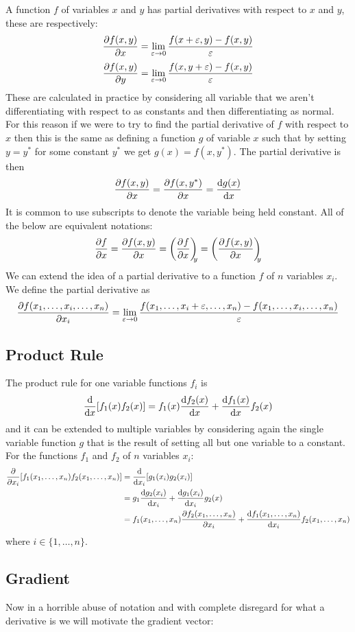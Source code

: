 \documentclass{article}
\begin{document}
    A function \(f\) of variables \(x\) and \(y\) has partial derivatives with respect to \(x\) and \(y\), these are respectively:
    \[\pdv{f(x, y)}{x} = \lim_{\varepsilon\to 0}\frac{f(x + \varepsilon, y) - f(x, y)}{\varepsilon}\]
    \[\pdv{f(x, y)}{y} = \lim_{\varepsilon\to 0}\frac{f(x, y + \varepsilon) - f(x, y)}{\varepsilon}\]
    These are calculated in practice by considering all variable that we aren't differentiating with respect to as constants and then differentiating as normal.
    For this reason if we were to try to find the partial derivative of \(f\) with respect to \(x\) then this is the same as defining a function \(g\) of variable \(x\) such that by setting \(y = y^*\) for some constant \(y^*\) we get \(g(x) = f(x, y^*)\).
    The partial derivative is then
    \[\pdv{f(x, y)}{x} = \pdv{f(x, y^*)}{x} = \dv{g(x)}{x}\]
    It is common to use subscripts to denote the variable being held constant.
    All of the below are equivalent notations:
    \[\pdv{f}{x} = \pdv{f(x, y)}{x} = \left(\pdv[]{f}{x}\right)_{\!\!\!{y}} = \left(\pdv[]{f(x, y)}{x}\right)_{\!\!\!{y}}\]
    We can extend the idea of a partial derivative to a function \(f\) of \(n\) variables \(x_i\).
    We define the partial derivative as
    \[\pdv{f({x_1,\dotsc,x_i,\dotsc,x_n})}{x_i} = \lim_{\varepsilon\to 0}\frac{f(x_1,\dotsc,x_i+\varepsilon,\dotsc,x_n) - f(x_1,\dotsc,x_i,\dotsc,x_n)}{\varepsilon}\]
    \subsection{Product Rule}
    The product rule for one variable functions \(f_i\) is
    \[\dv{x}[f_1(x)f_2(x)] = f_1(x)\dv{f_2(x)}{x} + \dv{f_1(x)}{x}f_2(x)\]
    and it can be extended to multiple variables by considering again the single variable function \(g\) that is the result of setting all but one variable to a constant.
    For the functions \(f_1\) and \(f_2\) of \(n\) variables \(x_i\):
    \begin{align*}
        \pdv{x_i}[f_1(x_1,\dotsc,x_n)f_2(x_1,\dotsc,x_n)] &= \dv{x_i}[g_1(x_i)g_2(x_i)]\\
        & = g_1\dv{g_2(x_i)}{x_i} + \dv{g_1(x_i)}{x_i}g_2(x)\\
        & = f_1(x_1,\dotsc,x_n)\pdv{f_2(x_1,\dotsc,x_n)}{x_i} + \dv{f_1(x_1,\dotsc,x_n)}{x_i}f_2(x_1,\dotsc,x_n)
    \end{align*}
    where \(i\in\{1,\dotsc,n\}\).
    \subsection{Gradient}\label{section:gradient vector motivation}
    Now in a horrible abuse of notation and with complete disregard for what a derivative is we will motivate the gradient vector:
    
\end{document}
